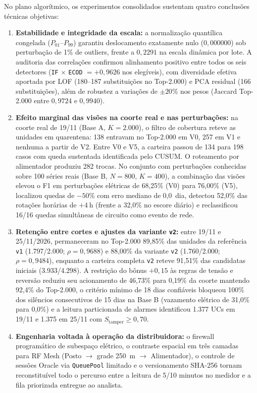 No plano algorítmico, os experimentos consolidados sustentam quatro conclusões técnicas objetivas:
\begin{enumerate}
\item \textbf{Estabilidade e integridade da escala:} a normalização quantílica congelada ($P_{01}$--$P_{99}$) garantiu deslocamento exatamente nulo ($0{,}000000$) sob perturbação de 1\% de outliers, frente a $0{,}2291$ na escala dinâmica por lote. A auditoria das correlações confirmou alinhamento positivo entre todos os seis detectores (\texttt{IF} $\times$ \texttt{ECOD} $= +0{,}9626$ nos elegíveis), com diversidade efetiva aportada por LOF (180--187 substituições no Top-2.000) e PCA residual (166 substituições), além de robustez a variações de $\pm 20\%$ nos pesos (Jaccard Top-2.000 entre $0{,}9724$ e $0{,}9940$).
\item \textbf{Efeito marginal das visões na coorte real e nas perturbações:} na coorte real de 19/11 (Base A, $K = 2.000$), o filtro de cobertura reteve as unidades em quarentena: 138 entravam no Top-2.000 em V0, 257 em V1 e nenhuma a partir de V2. Entre V0 e V5, a carteira passou de 134 para 198 casos com queda sustentada identificada pelo CUSUM. O roteamento por alimentador produziu 282 trocas. No conjunto com perturbações conhecidas sobre 100 séries reais (Base B, $N = 800$, $K = 400$), a combinação das visões elevou o F1 em perturbações elétricas de 68,25\% (V0) para 76,00\% (V5), localizou quedas de $-50\%$ com erro mediano de 0,0~dia, detectou 52,0\% das rotações horárias de $+4\ \mathrm{h}$ (frente a 32,0\% no escore diário) e reclassificou 16/16 quedas simultâneas de circuito como evento de rede.
\item \textbf{Retenção entre cortes e ajustes da variante \texttt{v2}:} entre 19/11 e 25/11/2026, permaneceram no Top-2.000 89,85\% das unidades da referência \texttt{v1} (1.797/2.000; $\rho = 0{,}9688$) e 88,00\% da variante \texttt{v2} (1.760/2.000; $\rho = 0{,}9484$), enquanto a carteira completa \texttt{v2} reteve 91,51\% das candidatas iniciais (3.933/4.298). A restrição do bônus $+0{,}15$ às regras de tensão e reversão reduziu seu acionamento de 46,73\% para 0,19\% da coorte mantendo 92,4\% do Top-2.000, o critério mínimo de 18 dias confiáveis bloqueou 100\% dos silêncios consecutivos de 15 dias na Base B (vazamento elétrico de 31,0\% para 0,0\%) e a leitura particionada de alarmes identificou 1.377 UCs em 19/11 e 1.375 em 25/11 com $S_{\text{tamper}} \ge 0{,}70$.
\item \textbf{Engenharia voltada à operação da distribuidora:} o firewall programático de subespaço elétrico, o contraste espacial em três camadas para RF Mesh (Posto $\to$ grade 250~m $\to$ Alimentador), o controle de sessões Oracle via \texttt{QueuePool} limitado e o versionamento SHA-256 tornam reconstituível todo o percurso entre a leitura de 5/10 minutos no medidor e a fila priorizada entregue ao analista.
\end{enumerate}

